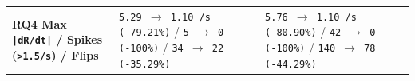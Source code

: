 \documentclass[10.5pt,a4paper]{article}
\begin{document}
\begin{footnotesize}
\begin{longtable}{>{\raggedright\arraybackslash}p{} >{\raggedright\arraybackslash}p{} >{\raggedright\arraybackslash}p{}}
\textbf{RQ4 Max \texttt{|dR/\allowbreak{}dt|} / Spikes (\texttt{>1.\allowbreak{}5/\allowbreak{}s}) / Flips} & \texttt{5.\allowbreak{}29 $\rightarrow$ 1.\allowbreak{}10 /\allowbreak{}s (-\allowbreak{}79.\allowbreak{}21\%)} / \texttt{5 $\rightarrow$ 0 (-\allowbreak{}100\%)} / \texttt{34 $\rightarrow$ 22 (-\allowbreak{}35.\allowbreak{}29\%)} & \texttt{5.\allowbreak{}76 $\rightarrow$ 1.\allowbreak{}10 /\allowbreak{}s (-\allowbreak{}80.\allowbreak{}90\%)} / \texttt{42 $\rightarrow$ 0 (-\allowbreak{}100\%)} / \texttt{140 $\rightarrow$ 78 (-\allowbreak{}44.\allowbreak{}29\%)} \\
\end{longtable}
\end{footnotesize}
\end{document}
